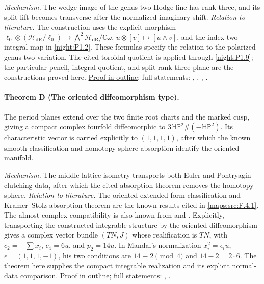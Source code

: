 \textit{Mechanism.} The wedge image of the genus-two Hodge line has rank three, and its split lift becomes transverse after the normalized imaginary shift.
\textit{Relation to literature.}
The construction uses the explicit morphism
$\ell_0\otimes(\mathcal H_{\mathrm{dR}}/\ell_0)
\to\bigwedge^2\mathcal H_{\mathrm{dR}}/\mathbb C\omega$,
$u\otimes[v]\mapsto[u\wedge v]$, and the index-two integral
map in \cref{night:P1.2}.  These formulas specify the
relation to the polarized genus-two variation.  The cited
toroidal quotient is applied through \cref{night:P1.9};
the particular pencil, integral quotient, and split rank-three
plane are the constructions proved here.
\hyperlink{outline-V-C}{Proof in outline}; full statements: , , , .

\hypertarget{main-V-D}{}
\paragraph{Theorem D (The oriented diffeomorphism type).}
\label{series:V:D}
The period planes extend over the two finite root charts and
the marked cusp, giving a compact complex fourfold diffeomorphic to
$3\mathbb{HP}^2\#(-\mathbb{HP}^2)$.  Its characteristic vector is
carried explicitly to $(1,1,1,1)$, after which the known smooth
classification and homotopy-sphere absorption identify the oriented
manifold.

\textit{Mechanism.} The middle-lattice isometry transports both Euler and Pontryagin clutching data, after which the cited absorption theorem removes the homotopy sphere.
\textit{Relation to literature.}
The oriented extended-form classification and Kramer--Stolz
absorption theorem are the known results cited in
\cref{maps:src:F.4.1}.  The almost-complex compatibility is
also known from \cite[Theorems~1--2, pp.~2--3]{Yang2012AC}
and \cite[Theorem~1.3 and Corollary~1.4, pp.~3--4]{ffMandal}.
Explicitly, transporting the constructed integrable structure
by the oriented diffeomorphism gives a complex vector bundle
$(TN,J)$ whose realification is $TN$, with
$c_2=-\sum x_i$, $c_4=6u$, and $p_2=14u$.
In Mandal's normalization $x_i^2=\epsilon_i u$,
$\epsilon=(1,1,1,-1)$, his two conditions are
$14\equiv2\pmod4$ and $14-2=2\cdot6$.
The theorem here supplies the compact integrable realization
and its explicit normal-data comparison.
\hyperlink{outline-V-D}{Proof in outline}; full statements: , .

